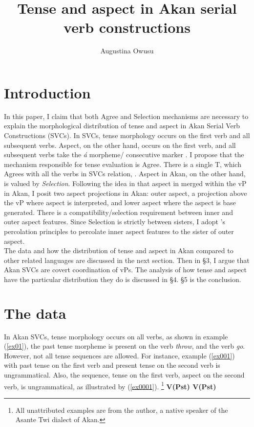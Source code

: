 \documentclass[output=paper,colorlinks,citecolor=brown]{langscibook}
\title{Tense and aspect in Akan serial verb constructions}
\author{%
 Augustina Owusu\affiliation{Rutgers University} 
}
\begin{document}
\maketitle 

\section{Introduction}\label{sec:owusu:1}

In this paper, I claim that both Agree and Selection mechanisms are necessary to explain the morphological distribution of tense and aspect in Akan Serial Verb Constructions (SVCs). In SVCs, tense morphology occurs on the first verb and all subsequent verbs. Aspect, on the other hand, occurs on the first verb, and all subsequent verbs take the \emph{\'a} morpheme/ consecutive marker \citep{Dolphyne1996, Osam2003}. I propose that the mechanism responsible for tense evaluation is Agree. There is a single T, which Agrees with all the verbs in SVCs relation, \citep{PesetskyTorrego2007}.  Aspect in Akan, on the other hand, is valued by \emph{Selection}. Following the idea in \citet{Kandybowicz2010, Kandybowicz2015} that aspect in merged within the vP in Akan, I posit two aspect projections in Akan: outer aspect, a projection above the vP where aspect is interpreted, and lower aspect where the aspect is base generated.  There is a compatibility/selection requirement between inner and outer aspect features. Since Selection is strictly between sisters, I adopt \citet{Webelhuth1992}'s percolation principles to percolate inner aspect features to the sister of outer aspect.\\
The data and how the distribution of tense and aspect in Akan compared to other related languages are discussed in the next section. Then in \S3, I argue that Akan SVCs are covert coordination of vPs. The analysis of how tense and aspect have the particular distribution they do is discussed in \S4. \S5 is the conclusion.  

\section{The data}
In Akan SVCs, tense morphology occurs on all verbs, as shown in example (\ref{ex01}), the past tense morpheme is present on the verb \emph{throw}, and the verb \emph{go}. However, not all tense sequences are allowed. For instance, example (\ref{ex001}) with past tense on the first verb and present tense on the second verb is ungrammatical. Also, the sequence, tense on the first verb, aspect on the second verb, is ungrammatical, as illustrated by (\ref{ex0001}).  
\ea \label{ex0}
\footnote{All unattributed examples are from the author, a native speaker of the Asante Twi dialect of Akan. } 
\ea \textbf{V(Pst) \phantom {} {} {} V(Pst)}
\end{document}
